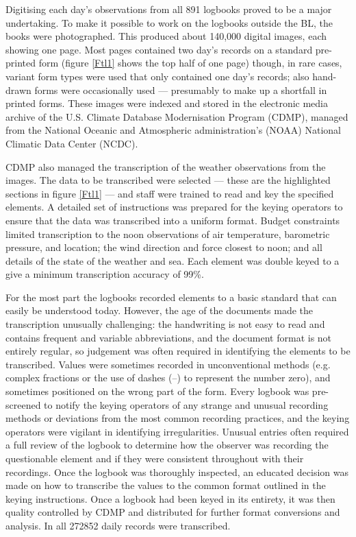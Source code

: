 \documentclass[CP]{copernicus}
\begin{document}
Digitising each day's observations from all 891 logbooks proved to be a major undertaking. To make it possible to work on the logbooks outside the BL, the books were photographed. This produced about 140,000 digital images, each showing one page. Most pages contained two day's records on a standard pre-printed form (figure \ref{Ftl1} shows the top half of one page) though, in rare cases, variant form types were used that only contained one day's records; also hand-drawn forms were occasionally used --- presumably to make up a shortfall in printed forms. These images were indexed and stored in the electronic media archive of the U.S. Climate Database Modernisation Program (CDMP), managed from the National Oceanic and Atmospheric administration's (NOAA) National Climatic Data Center (NCDC).

CDMP also managed the transcription of the weather observations from the images. The data to be transcribed were selected --- these are the highlighted sections in figure \ref{Ftl1} --- and staff were trained to read and key the specified elements. A detailed set of instructions was prepared for the keying operators to ensure that the data was transcribed into a uniform format. Budget constraints limited transcription to the noon observations of air temperature, barometric pressure, and location; the wind direction and force closest to noon; and all details of the state of the weather and sea. Each element was double keyed to a give a minimum transcription accuracy of 99\%.

For the most part the logbooks recorded elements to a basic standard that can easily be understood today. However, the age of the documents made the transcription unusually challenging: the handwriting is not easy to read and contains frequent and variable abbreviations, and the document format is not entirely regular, so judgement was often required in identifying the elements to be transcribed. Values were sometimes recorded in unconventional methods (e.g. complex fractions or the use of dashes (--) to represent the number zero), and sometimes positioned on the wrong part of the form. Every logbook was pre-screened to notify the keying operators of any strange and unusual recording methods or deviations from the most common recording practices, and the keying operators were vigilant in identifying irregularities. Unusual entries often required a full review of the logbook to determine how the observer was recording the questionable element and if they were consistent throughout with their recordings. Once the logbook was thoroughly inspected, an educated decision was made on how to transcribe the values to the common format outlined in the keying instructions. Once a logbook had been keyed in its entirety, it was then quality controlled by CDMP and distributed for further format conversions and analysis. In all 272852 daily records were transcribed. 
\end{document}
